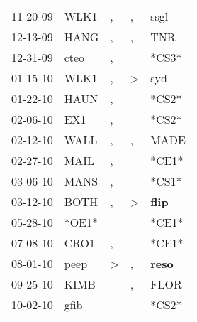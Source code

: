 \begin{supertabular}{p{0.07\textwidth}p{0.06\textwidth}p{0.02\textwidth}p{0.02\textwidth}p{0.06\textwidth}}
          11-20-09\textsuperscript{} &  WLK1\textsuperscript{} &                , &             , &           ssgl\textsuperscript{} \\
          12-13-09\textsuperscript{} &  HANG\textsuperscript{} &                , &             , &            TNR\textsuperscript{} \\
          12-31-09\textsuperscript{} &  cteo\textsuperscript{} &                , &               &                            *CS3* \\
          01-15-10\textsuperscript{} &  WLK1\textsuperscript{} &                , &  \textgreater &            syd\textsuperscript{} \\
          01-22-10\textsuperscript{} &  HAUN\textsuperscript{} &                , &               &                            *CS2* \\
          02-06-10\textsuperscript{} &   EX1\textsuperscript{} &                , &               &                            *CS2* \\
          02-12-10\textsuperscript{} &  WALL\textsuperscript{} &                , &             , &           MADE\textsuperscript{} \\
          02-27-10\textsuperscript{} &  MAIL\textsuperscript{} &                , &               &                            *CE1* \\
          03-06-10\textsuperscript{} &  MANS\textsuperscript{} &                , &               &                            *CS1* \\
          03-12-10\textsuperscript{} &  BOTH\textsuperscript{} &                , &  \textgreater &  \textbf{flip\textsuperscript{}} \\
          05-28-10\textsuperscript{} &                   *OE1* &                  &               &                            *CE1* \\
          07-08-10\textsuperscript{} &  CRO1\textsuperscript{} &                , &               &                            *CE1* \\
          08-01-10\textsuperscript{} &  peep\textsuperscript{} &     \textgreater &             , &  \textbf{reso\textsuperscript{}} \\
          09-25-10\textsuperscript{} &  KIMB\textsuperscript{} &                  &             , &           FLOR\textsuperscript{} \\
          10-02-10\textsuperscript{} &  gfib\textsuperscript{} &                  &               &                            *CS2* \\

\end{supertabular}
